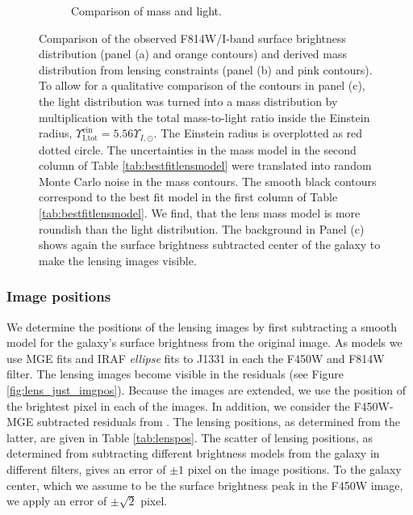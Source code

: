 \documentclass[useAMS,usenatbib]{mnras}
\begin{document}
\begin{figure}
\begin{subfigure}{.3\textwidth}
  \caption{Comparison of mass and light.}
  \label{fig:lenscompareboth}
\end{subfigure}
\caption{Comparison of the observed F814W/I-band surface brightness distribution (panel (a) and orange contours) and derived mass distribution from lensing constraints (panel (b) and pink contours). To allow for a qualitative comparison of the contours in panel (c), the light distribution was turned into a mass distribution by multiplication with the total mass-to-light ratio inside the Einstein radius, $\Upsilon_\text{I,tot}^\text{ein} = 5.56 \Upsilon_{I,\odot}$. The Einstein radius is overplotted as red dotted circle. The uncertainties in the mass model in the second column of Table \ref{tab:bestfitlensmodel} were translated into random Monte Carlo noise in the mass contours. The smooth black contours correspond to the best fit model in the first column of Table \ref{tab:bestfitlensmodel}. We find, that the lens mass model is more roundish than the light distribution. The background in Panel (c) shows again the surface brightness subtracted center of the galaxy to make the lensing images visible.}
\label{fig:lenslightcompareALL}
\end{figure}

\subsubsection{Image positions}

We determine the positions of the lensing images by first subtracting a smooth model for the galaxy's surface brightness from the original image. As models we use MGE fits and IRAF \emph{ellipse} fits to J1331 in each the F450W and F814W filter. The lensing images become visible in the residuals (see Figure \ref{fig:lens_just_imgpos}). Because the images are extended, we use the position of the brightest pixel in each of the images. In addition, we consider the F450W-MGE subtracted residuals from \citet{SWELLSIII}. The lensing positions, as determined from the latter, are given in Table \ref{tab:lenspos}. The scatter of lensing positions, as determined from subtracting different brightness models from the galaxy in different filters, gives an error of $\pm 1$ pixel on the image positions. To the galaxy center, which we assume to be the surface brightness peak in the F450W image, we apply an error of $\pm \sqrt{2}$ pixel.
\end{document}
